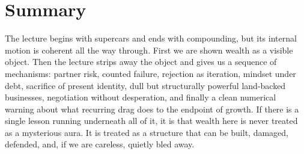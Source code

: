 \section{Summary}

The lecture begins with supercars and ends with compounding, but its internal motion is coherent all the way through. First we are shown wealth as a visible object. Then the lecture strips away the object and gives us a sequence of mechanisms: partner risk, counted failure, rejection as iteration, mindset under debt, sacrifice of present identity, dull but structurally powerful land-backed businesses, negotiation without desperation, and finally a clean numerical warning about what recurring drag does to the endpoint of growth. If there is a single lesson running underneath all of it, it is that wealth here is never treated as a mysterious aura. It is treated as a structure that can be built, damaged, defended, and, if we are careless, quietly bled away.